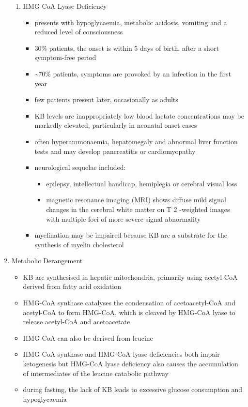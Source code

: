 \documentclass{scrartcl}
\begin{document}
\begin{enumerate}
\begin{enumerate}
\item HMG-CoA Lyase Deficiency
\label{sec:org4c6a6a4}
\begin{itemize}
\item presents with hypoglycaemia, metabolic acidosis, vomiting and a
reduced level of consciousness
\item 30\% patients, the onset is within 5 days of birth, after a short symptom-free period
\item \textasciitilde{}70\% patients, symptoms are provoked by an infection in the first year
\item few patients present later, occasionally as adults
\item KB levels are inappropriately low blood lactate concentrations
may be markedly elevated, particularly in neonatal onset cases
\item often hyperammonaemia, hepatomegaly and abnormal liver function tests and
may develop pancreatitis or cardiomyopathy
\item neurological sequelae included:
\begin{itemize}
\item epilepsy, intellectual handicap, hemiplegia or cerebral visual loss
\item magnetic resonance imaging (MRI) shows diffuse mild signal changes
in the cerebral white matter on T 2 -weighted images with multiple
foci of more severe signal abnormality
\end{itemize}
\item myelination may be impaired because KB are a substrate for the
synthesis of myelin cholesterol
\end{itemize}
\end{enumerate}

\item Metabolic Derangement
\label{sec:orgb14c52c}
\begin{itemize}
\item KB are synthesised in hepatic mitochondria, primarily using
acetyl-CoA derived from fatty acid oxidation
\item HMG-CoA synthase catalyses the condensation of acetoacetyl-CoA and
acetyl-CoA to form HMG-CoA, which is cleaved by HMG-CoA lyase to
release acetyl-CoA and acetoacetate
\item HMG-CoA can also be derived from leucine
\item HMG-CoA synthase and HMG-CoA lyase deficiencies both impair
ketogenesis but HMG-CoA lyase deficiency also causes the
accumulation of intermediates of the leucine catabolic pathway
\item during fasting, the lack of KB leads to excessive glucose
consumption and hypoglycaemia
\end{itemize}


\end{enumerate}
\end{document}
